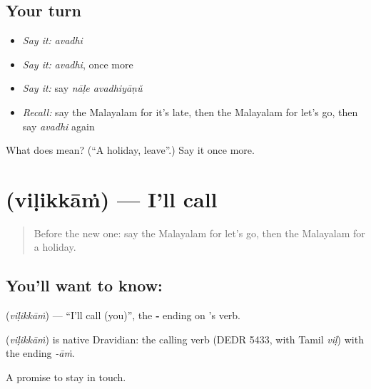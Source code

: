 \subsection*{Your turn}
\begin{itemize}
\raggedright
  \item \emph{Say it:} \emph{avadhi}
  \item \emph{Say it:} \emph{avadhi}, once more
  \item \emph{Say it:} say \emph{nāḷe avadhiyāṇŭ}
  \item \emph{Recall:} say the Malayalam for it's late, then the Malayalam for let's go, then say \emph{avadhi} again
\end{itemize}

\begin{tcolorbox}[breakable,colback=teal!4,colframe=teal!35!black,title={Before you move on}]
What does  mean? (\textquotedblleft{}A holiday, leave\textquotedblright{}.) Say it once more.
\end{tcolorbox}
\section[\texorpdfstring{\ml{വിളിക്കാം} (viḷikkāṁ)}{വിളിക്കാം (viḷikkāṁ)}]{ (viḷikkāṁ) — I'll call}

\label{lesson:ML-C127-illcall}



\begin{quote}
Before the new one: say the Malayalam for let's go, then the Malayalam for a holiday.
\end{quote}

\subsection*{You'll want to know: }
\textbf{} (\emph{viḷikkāṁ}) — \textquotedblleft{}I'll call (you)\textquotedblright{}, the \textbf{‑} ending on \textbf{}'s verb.

\begin{cousinweb}
\textbf{} (\emph{viḷikkāṁ}) is native Dravidian: the calling verb (DEDR 5433, with Tamil \emph{viḷ}) with the ending \emph{-āṁ}.
\end{cousinweb}

\begin{grammarlens}[title={What you've built}]
A promise to stay in touch.
\end{grammarlens}

